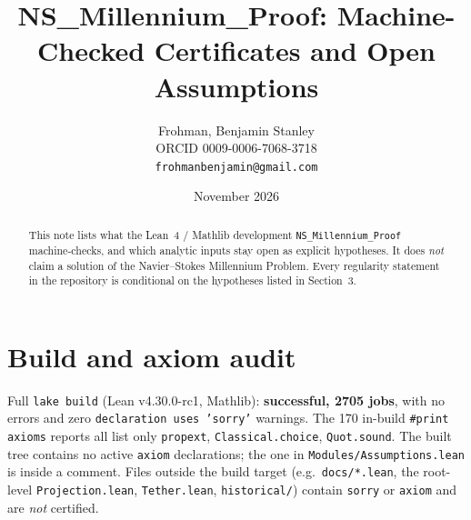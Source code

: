 \documentclass[11pt]{article}
\title{NS\_Millennium\_Proof: Machine-Checked Certificates and Open Assumptions}
\author{Frohman, Benjamin Stanley\\ ORCID 0009-0006-7068-3718\\ \texttt{frohmanbenjamin@gmail.com}}
\date{November 2026}
\begin{document}
\maketitle
\begin{abstract}
This note lists what the Lean~4 / Mathlib development \texttt{NS\_Millennium\_Proof} machine-checks, and which analytic inputs stay open as explicit hypotheses. It does \emph{not} claim a solution of the Navier--Stokes Millennium Problem. Every regularity statement in the repository is conditional on the hypotheses listed in Section~3.
\end{abstract}

\section{Build and axiom audit}
Full \texttt{lake build} (Lean v4.30.0-rc1, Mathlib): \textbf{successful, 2705 jobs}, with no errors and zero \texttt{declaration uses 'sorry'} warnings. The 170 in-build \texttt{\#print axioms} reports all list only \texttt{propext}, \texttt{Classical.choice}, \texttt{Quot.sound}. The built tree contains no active \texttt{axiom} declarations; the one in \texttt{Modules/Assumptions.lean} is inside a comment. Files outside the build target (e.g.\ \texttt{docs/*.lean}, the root-level \texttt{Projection.lean}, \texttt{Tether.lean}, \texttt{historical/}) contain \texttt{sorry} or \texttt{axiom} and are \emph{not} certified.
\end{document}
